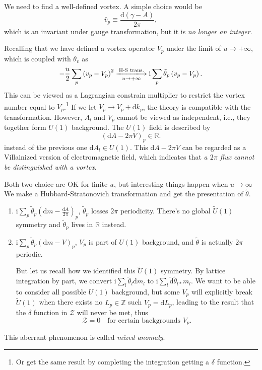 We need to find a well-defined vortex. A simple choice would be
\begin{equation}
  \bar{v}_{p} \equiv \frac{\mathrm{d} \left( \gamma - A \right)}{2 \pi },
\end{equation}
which is an invariant under gauge transformation,  but it is \emph{no longer an integer}.

Recalling that we have defined a vortex operator $V_p$ under the limit of $u \to+ \infty $, which is coupled with $\theta_{v}$ as 
\begin{equation}
  - \frac{u}{2} \sum_{p} \left( v_p - V_p \right)^{2} \xlongrightarrow[u \to +\infty]{\text{H-S trans.}} \mathrm{i} \sum_{p} \tilde{\theta}_{p} \left( v_p - V_p \right).
\end{equation}
This can be viewed as a Lagrangian constrain multiplier to restrict the vortex number equal to $V_p$.\footnote{Or get the same result by completing the integration getting a $\delta$ function.}
If we let $V_p \to V_p + \mathrm{d} k_p$, the theory is compatible with the transformation. However, $A_l$ and $V_p$ cannot be viewed as independent, i.e., they together form $U(1)$ background. The $U(1)$ field is described by
\begin{equation}
  \left( \mathrm{d} A - 2\pi V \right)_{p} \in \mathbb{R}.
\end{equation}
instead of the previous one $\mathrm{d} A_l \in U\left(1\right)$. This $\mathrm{d} A - 2\pi V$ can be regarded as a Villainized version of electromagnetic field, which indicates that \emph{a $2\pi $ flux cannot be distinguished with a vortex}.

Both two choice are OK for finite $u$, but interesting things happen when $u \to \infty $
We make a Hubbard-Stratonovich transformation and get the presentation of $\tilde{\theta}$. 
\begin{enumerate}
  \item $\displaystyle \mathrm{i} \sum_{p} \tilde{\theta} _{p} \left( \mathrm{d} m - \frac{\mathrm{d} A}{2\pi } \right)_{p}$, $\tilde{\theta}_{p}$ losses $2\pi $ periodicity. There's no global $\tilde{U}(1)$ symmetry and $\tilde{\theta}_{p}$ lives in $\mathbb{R}$ instead.
  \item $\displaystyle \mathrm{i}\sum_{p} \tilde{\theta}_{p} \left( \mathrm{d} m - V \right)_{p}$, $V_p$ is part of $U(1)$ background, and $\tilde{\theta}$ is actually $2\pi $ periodic.
    
    But let us recall how we identified this $\tilde{U}(1)$ symmetry. By lattice integration by part, we convert $\mathrm{i}\sum_{l} \tilde{\theta}_{l} \mathrm{d} m_l$ to $\mathrm{i}\sum_{l} \tilde{\mathrm{d} } \tilde{\theta}_{l*} m_l $. We want to be able to consider all possible $U(1)$ background, but some $V_p$ will explicitly break $\tilde{U}(1)$ when there exists no $L_p \in \mathbb{Z}$ such $V_p = \mathrm{d} L_p$, leading to the result that the $\delta$ function in $\mathcal{Z}$ will never be met, thus
    \begin{equation}
      \mathcal{Z} = 0 \quad \text{for certain backgrounds $V_p$}.
    \end{equation}
\end{enumerate}
This aberrant phenomenon is called \emph{mixed anomaly}.

